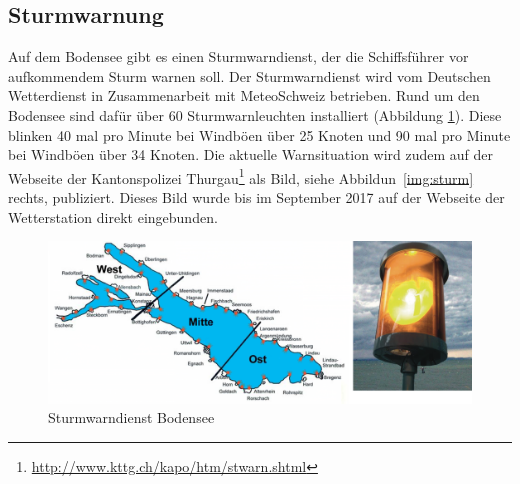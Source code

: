\subsection{Sturmwarnung}
\label{subsec:sturmwarnung}
Auf dem Bodensee gibt es einen Sturmwarndienst, der die Schiffsführer vor aufkommendem Sturm warnen soll. Der Sturmwarndienst wird vom Deutschen Wetterdienst in Zusammenarbeit mit MeteoSchweiz betrieben. Rund um den Bodensee sind dafür über 60 Sturmwarnleuchten installiert (Abbildung \ref{img:sturm2}). Diese blinken 40 mal pro Minute bei Windböen  über 25 Knoten und 90 mal pro Minute bei Windböen über 34 Knoten. Die aktuelle Warnsituation wird zudem auf der Webseite der Kantonspolizei Thurgau\footnote{ \url{http://www.kttg.ch/kapo/htm/stwarn.shtml}} als Bild, siehe Abbildun~\ref{img:sturm} rechts, publiziert. Dieses Bild wurde bis im September 2017 auf der Webseite der Wetterstation direkt eingebunden.

\begin{figure}[h!]
	\centering
	\includegraphics[width=1\linewidth]{img/sturm2}
	\caption{Sturmwarndienst Bodensee}
	\label{img:sturm2}
\end{figure}


